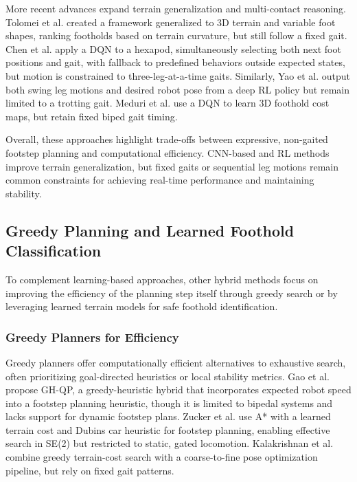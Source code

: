 More recent advances expand terrain generalization and multi-contact
reasoning. Tolomei et al. \cite{tolomei_learning_2025} created
a framework generalized to 3D terrain and variable foot shapes,
ranking footholds based on terrain curvature, but still follow a
fixed gait. Chen et al. \cite{chen_gait_2024} apply a DQN to a
hexapod, simultaneously selecting both next foot positions and gait,
with fallback to predefined behaviors outside expected states, but
motion is constrained to three-leg-at-a-time gaits. Similarly, Yao et
al. \cite{yao_hierarchical_2021} output both swing leg motions and
desired robot pose from a deep RL policy but remain limited to a
trotting gait. Meduri et al. \cite{meduri_deepq_2021} use a DQN to
learn 3D foothold cost maps, but retain fixed biped gait timing.

Overall, these approaches highlight trade-offs between expressive,
non-gaited footstep planning and computational efficiency. CNN-based
and RL methods improve terrain generalization, but fixed gaits or
sequential leg motions remain common constraints for achieving
real-time performance and maintaining stability.

\subsection{Greedy Planning and Learned Foothold Classification}
\label{sec:hybrid-greedy-classification}

To complement learning-based approaches, other hybrid methods focus
on improving the efficiency of the planning step itself through
greedy search or by leveraging learned terrain models for safe
foothold identification.

\subsubsection{Greedy Planners for Efficiency}

Greedy planners offer computationally efficient alternatives to
exhaustive search, often prioritizing goal-directed heuristics or
local stability metrics. Gao et al. \cite{gao_global_2024} propose
GH-QP, a greedy-heuristic hybrid that incorporates expected robot
speed into a footstep planning heuristic, though it is limited to
bipedal systems and lacks support for dynamic footstep plans. Zucker
et al. \cite{zucker_optimization_2011} use A* with a learned terrain
cost and Dubins car heuristic for footstep planning, enabling
effective search in SE(2) but restricted to static, gated locomotion.
Kalakrishnan et al. \cite{kalakrishnan_learning_2011} combine greedy
terrain-cost search with a coarse-to-fine pose optimization pipeline,
but rely on fixed gait patterns.

